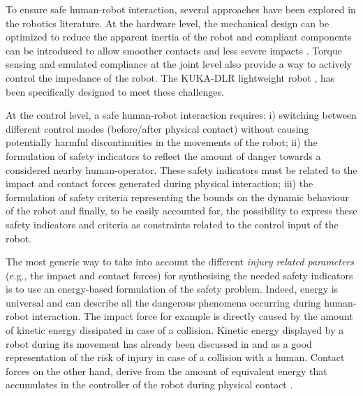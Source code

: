 \documentclass[letterpaper, 10 pt, conference]{ieeeconf}      %
\begin{document}
To ensure safe human-robot interaction, several approaches have been explored in the robotics literature. At the hardware level, the mechanical design can be optimized to reduce the apparent inertia of the robot \cite{zinn2004} and compliant components can be introduced to allow smoother contacts and less severe impacts \cite{haddadin2012}. Torque sensing and emulated compliance at the joint level also provide a way to actively control the impedance of the robot. The KUKA-DLR lightweight robot \cite{bischoff2010kuka}, \cite{loughlin2007dlr} has been specifically designed to meet these challenges.
 
At the control level, a safe human-robot interaction requires: i) switching between different control modes (before/after physical contact) without causing potentially harmful discontinuities in the movements of the robot; ii) the formulation of safety indicators to reflect the amount of danger towards a considered nearby human-operator. These safety indicators must be related to the  impact and contact forces generated during physical interaction; iii) the formulation of safety criteria representing the bounds on the dynamic behaviour of the robot and finally, to be easily accounted for, the possibility to express these safety indicators and criteria as constraints related to the control input of the robot. 

The most generic way to take into account the different \textit{injury related parameters} (e.g., the impact and contact forces) \cite{ISO15066PDF} for synthesising the needed safety indicators is to use an energy-based formulation of the safety problem. Indeed, energy is universal and can describe all the dangerous phenomena occurring during human-robot interaction. The impact force for example is directly caused by the amount of kinetic energy dissipated in case of a collision. Kinetic energy displayed by a robot during its movement has already been discussed in \cite{haddadin2008collision} and \cite{haddadin2012truly} as a good representation of the risk of injury in case of a collision with a human. Contact forces on the other hand, derive from the amount of equivalent energy that accumulates in the controller of the robot during physical contact \cite{schindlbeck2015unified}. 
\end{document}
